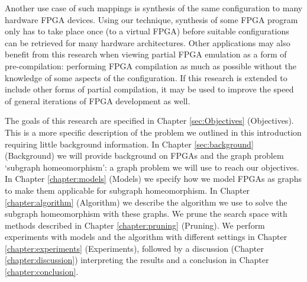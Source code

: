 Another use case of such mappings is synthesis of the same configuration to many hardware FPGA devices. Using our technique, synthesis of some FPGA program only has to take place once (to a virtual FPGA) before suitable configurations can be retrieved for many hardware architectures. Other applications may also benefit from this research when viewing partial FPGA emulation as a form of pre-compilation: performing FPGA compilation as much as possible without the knowledge of some aspects of the configuration. If this research is extended to include other forms of partial compilation, it may be used to improve the speed of general iterations of FPGA development as well.

The goals of this research are specified in Chapter \ref{sec:Objectives} (Objectives). This is a more specific description of the problem we outlined in this introduction requiring little background information. In Chapter \ref{sec:background} (Background) we will provide background on FPGAs and the graph problem `subgraph homeomorphism': a graph problem we will use to reach our objectives. In Chapter \ref{chapter:models} (Models) we specify how we model FPGAs as graphs to make them applicable for subgraph homeomorphism. In Chapter \ref{chapter:algorithm} (Algorithm) we describe the algorithm we use to solve the subgraph homeomorphism with these graphs. We prune the search space with methods described in Chapter \ref{chapter:pruning} (Pruning). We perform experiments with models and the algorithm with different settings in Chapter \ref{chapter:experiments} (Experiments), followed by a discussion (Chapter \ref{chapter:discussion}) interpreting the results and a conclusion in Chapter \ref{chapter:conclusion}.